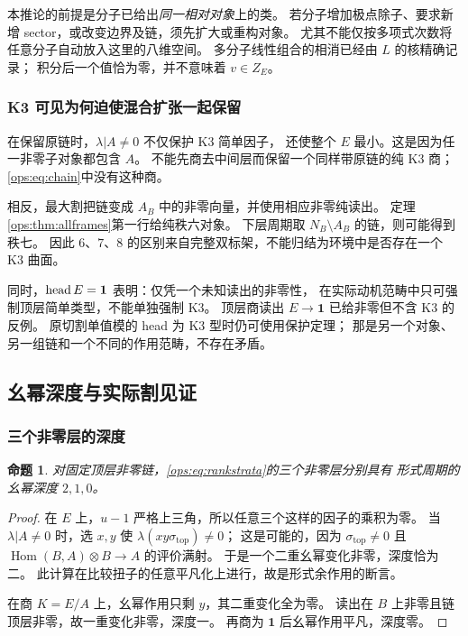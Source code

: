 \documentclass[11pt,a4paper,oneside]{ctexart}
\theoremstyle{cnplain}
\newtheorem{proposition}[theorem]{命题}
\theoremstyle{definition}
\theoremstyle{remark}
\newcommand{\Hom}{\operatorname{Hom}}
\numberwithin{equation}{section}
\begin{document}
本推论的前提是分子已给出\emph{同一相对对象}上的类。
若分子增加极点除子、要求新增 sector，或改变边界及链，须先扩大或重构对象。
尤其不能仅按多项式次数将任意分子自动放入这里的八维空间。
多分子线性组合的相消已经由 $L$ 的核精确记录；
积分后一个值恰为零，并不意味着 $v\in Z_E$。

\subsubsection{K3 可见为何迫使混合扩张一起保留}
在保留原链时，$\lambda|A\ne0$ 不仅保护 K3 简单因子，
还使整个 $E$ 最小。这是因为任一非零子对象都包含 $A$。
不能先商去中间层而保留一个同样带原链的纯 K3 商；
\eqref{ops:eq:chain}中没有这种商。

相反，最大割把链变成 $A_B$ 中的非零向量，并使用相应非零纯读出。
定理\ref{ops:thm:allframes}第一行给纯秩六对象。
下层周期取 $N_B\setminus A_B$ 的链，则可能得到秩七。
因此 $6$、$7$、$8$ 的区别来自完整双标架，不能归结为环境中是否存在一个 K3 曲面。

同时，$\operatorname{head} E=\mathbf1$ 表明：仅凭一个未知读出的非零性，
在实际动机范畴中只可强制顶层简单类型，不能单独强制 K3。
顶层商读出 $E\to\mathbf1$ 已给非零但不含 K3 的反例。
原切割单值模的 head 为 K3 型时仍可使用保护定理；
那是另一个对象、另一组链和一个不同的作用范畴，不存在矛盾。


\subsection{幺幂深度与实际割见证}
\subsubsection{三个非零层的深度}
\begin{proposition}\label{ops:prop:depth}
对固定顶层非零链，\eqref{ops:eq:rankstrata}的三个非零层分别具有
形式周期的幺幂深度 $2,1,0$。
\end{proposition}
\begin{proof}
在 $E$ 上，$u-1$ 严格上三角，所以任意三个这样的因子的乘积为零。
当 $\lambda|A\ne0$ 时，选 $x,y$ 使 $\lambda(xy\sigma_{\mathrm{top}})\ne0$；
这是可能的，因为 $\sigma_{\mathrm{top}}\ne0$ 且
$\Hom(B,A)\otimes B\to A$ 的评价满射。
于是一个二重幺幂变化非零，深度恰为二。
此计算在比较扭子的任意平凡化上进行，故是形式余作用的断言。

在商 $K=E/A$ 上，幺幂作用只剩 $y$，其二重变化全为零。
读出在 $B$ 上非零且链顶层非零，故一重变化非零，深度一。
再商为 $\mathbf1$ 后幺幂作用平凡，深度零。
\end{proof}
\end{document}
